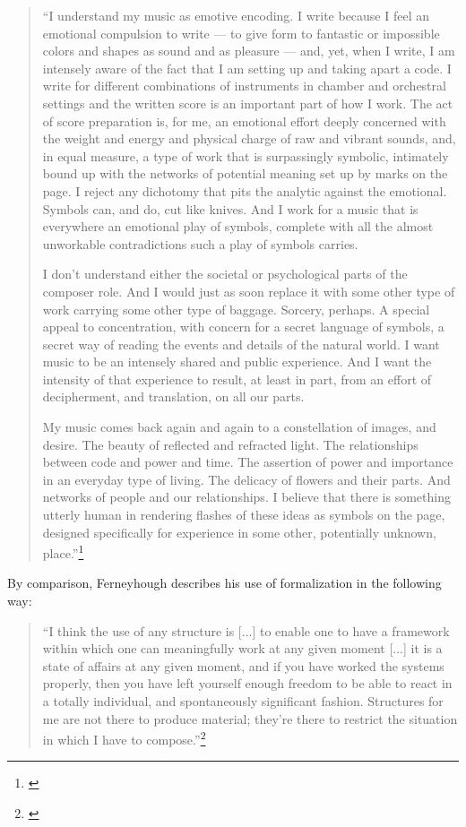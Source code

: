 \begin{quote}
    \singlespacing
``I understand my music as emotive encoding. I write because I feel an emotional compulsion to write — to give form to fantastic or impossible colors and shapes as sound and as pleasure — and, yet, when I write, I am intensely aware of the fact that I am setting up and taking apart a code. I write for different combinations of instruments in chamber and orchestral settings and the written score is an important part of how I work. The act of score preparation is, for me, an emotional effort deeply concerned with the weight and energy and physical charge of raw and vibrant sounds, and, in equal measure, a type of work that is surpassingly symbolic, intimately bound up with the networks of potential meaning set up by marks on the page. I reject any dichotomy that pits the analytic against the emotional. Symbols can, and do, cut like knives. And I work for a music that is everywhere an emotional play of symbols, complete with all the almost unworkable contradictions such a play of symbols carries.

I don't understand either the societal or psychological parts of the composer role. And I would just as soon replace it with some other type of work carrying some other type of baggage. Sorcery, perhaps. A special appeal to concentration, with concern for a secret language of symbols, a secret way of reading the events and details of the natural world. I want music to be an intensely shared and public experience. And I want the intensity of that experience to result, at least in part, from an effort of decipherment, and translation, on all our parts.

My music comes back again and again to a constellation of images, and desire. The beauty of reflected and refracted light. The relationships between code and power and time. The assertion of power and importance in an everyday type of living. The delicacy of flowers and their parts. And networks of people and our relationships. I believe that there is something utterly human in rendering flashes of these ideas as symbols on the page, designed specifically for experience in some other, potentially unknown, place.''\footnote{\citet{bacawebsite}}
\end{quote}

By comparison, Ferneyhough describes his use of formalization in the following way:

\begin{quote}
    \singlespacing
    ``I think the use of any structure is [...] to enable one to have a framework within which one can meaningfully work at any given moment [...] it is a state of affairs at any given moment, and if you have worked the systems properly, then you have left yourself enough freedom to be able to react in a totally individual, and spontaneously significant fashion. Structures for me are not there to produce material; they're there to restrict the situation in which I have to compose.''\footnote{\citet[62]{toop}}
\end{quote}

